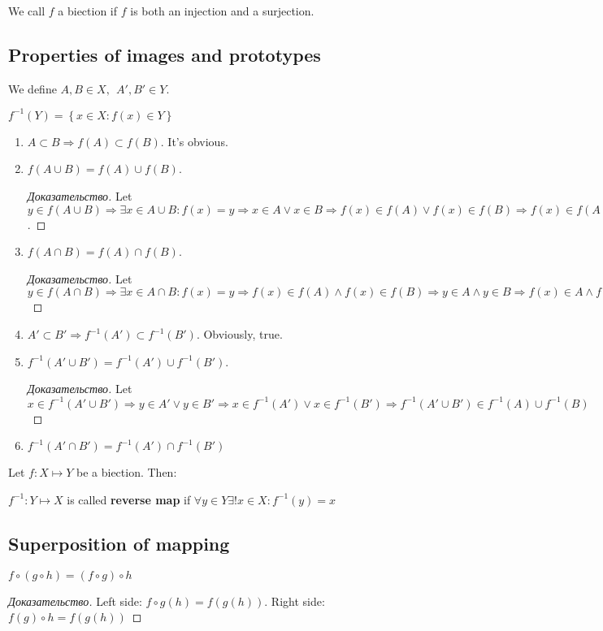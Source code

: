 \begin{definition}[biection]
	We call $f$ a biection if $f$ is both an injection and a surjection.
\end{definition}

\subsection{Properties of images and prototypes}

We define $A,B \in X, \ \ A', B' \in Y$.

\begin{definition}[an image]
	$f^{-1}(Y) = \left\{ x \in X : f(x) \in Y \right \} $
\end{definition}

\begin{enumerate}
	\item $A \subset B \Rightarrow f(A) \subset f(B)$. It's obvious.
	\item $f(A \cup B) = f(A) \cup f(B)$.
	\begin{proof}[Доказательство]
		Let $y \in f(A \cup B) \Rightarrow \exists x \in A \cup B: f(x) = y \Rightarrow x \in A \vee x \in B \Rightarrow f(x) \in f(A) \vee f(x) \in f(B) \Rightarrow f(x) \in f(A) \cup f(B)$.
	\end{proof}
	\item $f(A \cap B) = f(A) \cap f(B)$.
	\begin{proof}[Доказательство]
		Let $y \in f(A \cap B) \Rightarrow \exists x \in A \cap B: f(x) = y \Rightarrow f(x) \in f(A) \wedge f(x) \in f(B) \Rightarrow y \in A \wedge y \in B \Rightarrow f(x) \in A \wedge f(x) \in B \Rightarrow f(A \cap B) = f(A) \cap f(B) $
	\end{proof}
	\item $A' \subset B' \Rightarrow f^{-1}(A') \subset f^{-1}(B')$. Obviously, true.
	\item $f^{-1}(A' \cup B') = f^{-1}(A') \cup f^{-1}(B').$
	\begin{proof}[Доказательство]
		Let $x \in f^{-1}(A' \cup B') \Rightarrow y \in A' \vee y \in B' \Rightarrow x \in f^{-1}(A') \vee x \in f^{-1}(B') \Rightarrow f^{-1}(A' \cup B') \in f^{-1}(A) \cup f^{-1}(B)$
	\end{proof}
	\item $f^{-1}(A' \cap B') = f^{-1}(A') \cap f^{-1}(B')$
\end{enumerate}

Let $f: X \mapsto Y$ be a biection. Then:
\begin{definition}
	$f^{-1}: Y \mapsto X$ is called \textbf{reverse map} if $\forall y \in Y \exists ! x \in X: f^{-1}(y) = x$
\end{definition}
\subsection{Superposition of mapping}

\begin{theorem}[associativity]
	$f \circ (g \circ h) = (f \circ g) \circ h$
\end{theorem}

\begin{proof}[Доказательство]
	Left side: $f \circ g(h) = f(g(h))$.
	Right side: $f(g) \circ h = f(g(h))$
\end{proof}
